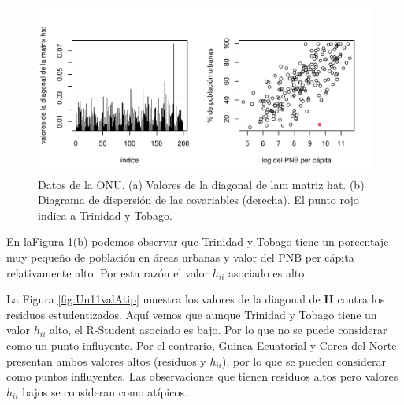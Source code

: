 \documentclass[
]{article}
\begin{document}
\begin{figure}

{\centering \includegraphics{MLGI_files/figure-latex/Un11Hdiag-1} 

}

\caption{Datos de la ONU. (a) Valores de la diagonal de lam matriz hat. (b) Diagrama de dispersión de las covariables (derecha). El punto rojo indica a Trinidad y Tobago.}\label{fig:Un11Hdiag}
\end{figure}

En laFigura \ref{fig:Un11Hdiag}(b) podemos observar que Trinidad y Tobago tiene un porcentaje muy pequeño de población en áreas urbanas y valor del PNB per cápita relativamente alto. Por esta razón el valor \(h_{ii}\) asociado es alto.

La Figura \ref{fig:Un11valAtip} muestra los valores de la diagonal de \(\boldsymbol H\) contra los residuos estudentizados. Aquí vemos que aunque Trinidad y Tobago tiene un valor \(h_{ii}\) alto, el R-Student asociado es bajo. Por lo que no se puede considerar como un punto influyente. Por el contrario, Guinea Ecuatorial y Corea del Norte presentan ambos valores altos (residuos y \(h_{ii}\)), por lo que se pueden considerar como puntos influyentes. Las observaciones que tienen residuos altos pero valores \(h_{ii}\) bajos se consideran como atípicos.
\end{document}
